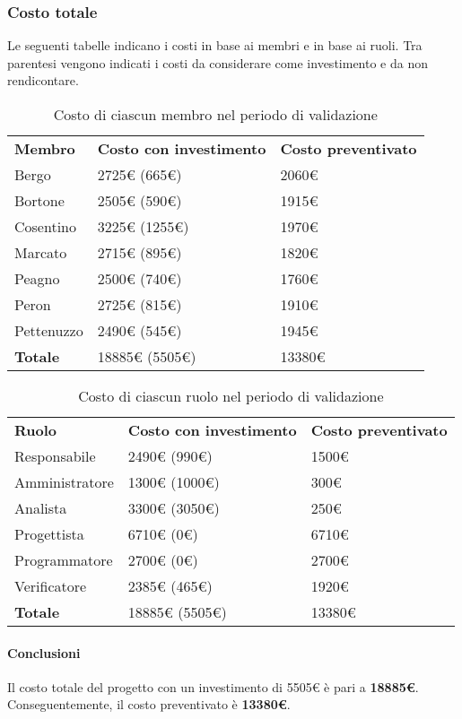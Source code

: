 	\subsubsection{Costo totale}
		Le seguenti tabelle indicano i costi in base ai membri e in base ai ruoli. Tra parentesi vengono indicati i costi da considerare come investimento e da non rendicontare.
		\begin{table}[h]
		\centering
		\begin{tabular}{| l | l | l |}
			\rowcolor{LightBlue}
			\textbf{\color{white}Membro}
			& \textbf{\color{white}Costo con investimento}
			& \textbf{\color{white}Costo preventivato}\\
			
			Bergo				& 2725€ (665€)  & 2060€\\
			Bortone			& 2505€ (590€)  & 1915€\\
			Cosentino		& 3225€ (1255€) & 1970€\\
			Marcato			& 2715€ (895€)  & 1820€\\
			Peagno				& 2500€ (740€)  & 1760€\\
			Peron				& 2725€ (815€)  & 1910€\\
			Pettenuzzo		& 2490€ (545€)  & 1945€\\ \hline
			\textbf{Totale} & 18885€ (5505€) & 13380€\\ \hline
		\end{tabular}
		\caption{Costo di ciascun membro nel periodo di validazione}
		\end{table}
		
		\begin{table}[h]
		\centering
		\begin{tabular}{| l | l | l |}
			\rowcolor{LightBlue}
			\textbf{\color{white}Ruolo}
			& \textbf{\color{white}Costo con investimento}
			& \textbf{\color{white}Costo preventivato}\\
			
			Responsabile 		& 2490€ (990€) & 1500€\\
			Amministratore 	& 1300€ (1000€) & 300€\\
			Analista 				& 3300€ (3050€) & 250€\\			
			Progettista 			& 6710€ (0€) & 6710€\\
			Programmatore 		& 2700€ (0€) & 2700€\\
			Verificatore 		& 2385€ (465€) & 1920€\\ \hline
			\textbf{Totale} 	& 18885€ (5505€) & 13380€\\ \hline
		\end{tabular}		
		\caption{Costo di ciascun ruolo nel periodo di validazione}
		\end{table}
		
		\paragraph{Conclusioni\\}
		Il costo totale del progetto con un investimento di 5505€ è pari a \textbf{18885€}. Conseguentemente, il costo preventivato è \textbf{13380€}.